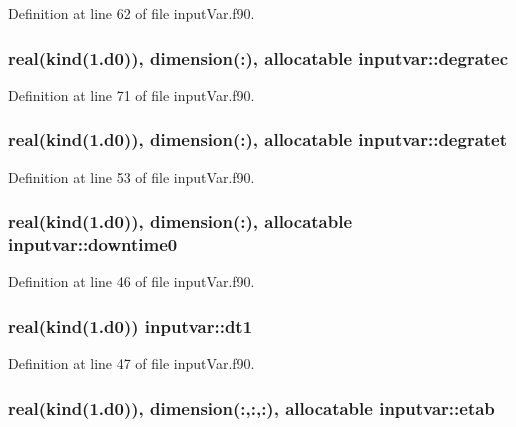 Definition at line 62 of file input\-Var.\-f90.

\hypertarget{classinputvar_a60a72e191c29f7558641179db3a7fd65}{
\subsubsection[{degratec}]{\setlength{\rightskip}{0pt plus 5cm}real(kind(1.d0)), dimension(\-:), allocatable inputvar\-::degratec}}\label{classinputvar_a60a72e191c29f7558641179db3a7fd65}


Definition at line 71 of file input\-Var.\-f90.

\hypertarget{classinputvar_ac55cb9b2b78bb635b7083a15b40013e1}{
\subsubsection[{degratet}]{\setlength{\rightskip}{0pt plus 5cm}real(kind(1.d0)), dimension(\-:), allocatable inputvar\-::degratet}}\label{classinputvar_ac55cb9b2b78bb635b7083a15b40013e1}


Definition at line 53 of file input\-Var.\-f90.

\hypertarget{classinputvar_ab7b48e990ab724feb4e8d6297d3cd63c}{
\subsubsection[{downtime0}]{\setlength{\rightskip}{0pt plus 5cm}real(kind(1.d0)), dimension(\-:), allocatable inputvar\-::downtime0}}\label{classinputvar_ab7b48e990ab724feb4e8d6297d3cd63c}


Definition at line 46 of file input\-Var.\-f90.

\hypertarget{classinputvar_a8d3f282e92e7ea93ad6b14576bc3458b}{
\subsubsection[{dt1}]{\setlength{\rightskip}{0pt plus 5cm}real(kind(1.d0)) inputvar\-::dt1}}\label{classinputvar_a8d3f282e92e7ea93ad6b14576bc3458b}


Definition at line 47 of file input\-Var.\-f90.

\hypertarget{classinputvar_ac19333b401f362c7b0ed89ec10590872}{
\subsubsection[{etab}]{\setlength{\rightskip}{0pt plus 5cm}real(kind(1.d0)), dimension(\-:,\-:,\-:), allocatable inputvar\-::etab}}\label{classinputvar_ac19333b401f362c7b0ed89ec10590872}


